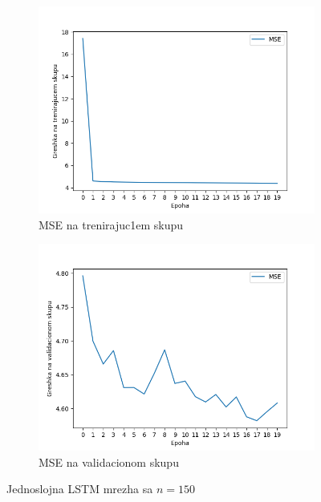 \documentclass[a4paper, openany, oneside, 11pt]{book}
\begin{document}
\newpage
\begin{figure}[!h]
        \centering
        \begin{subfigure}{0.475\textwidth}
            \centering
            \includegraphics[scale=0.45]{res/SingleLayerLSTM_120units_train.png}
            \caption{\acrshort{MSE} na trenirajuc1em skupu}
            \label{fig:4_4a}
            \vspace{0pt}
        \end{subfigure}%
        \begin{subfigure}{0.475\textwidth}
            \centering
            \includegraphics[scale=0.45]{res/SingleLayerLSTM_120units_validation.png}
            \caption{\acrshort{MSE} na validacionom skupu}
            \label{fig:4_4b}
            \vspace{0pt}
        \end{subfigure}
        \caption{Jednoslojna \acrshort{LSTM} mrezha sa $n=150$}
        \label{fig:4_4}
\end{figure}
\end{document}
